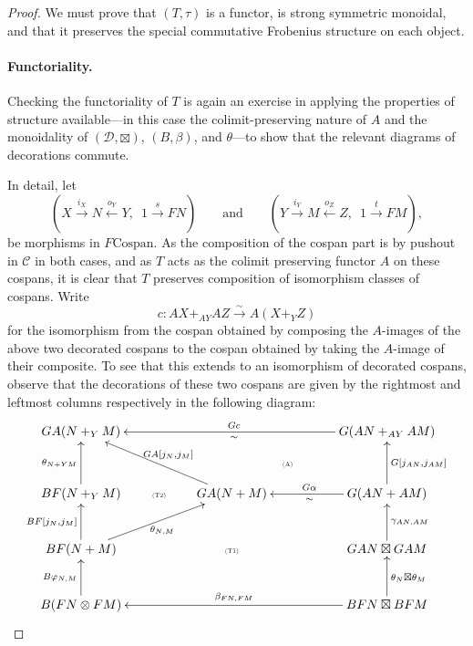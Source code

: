 \begin{proof}
  We must prove that $(T,\tau)$ is a functor, is strong symmetric monoidal, and
  that it preserves the special commutative Frobenius structure on each object.

  \paragraph{Functoriality.}
  Checking the functoriality of $T$ is again an exercise in applying the
  properties of structure available---in this case the colimit-preserving nature
  of $A$ and the monoidality of $(\mathcal D,\boxtimes)$, $(B,\beta)$, and
  $\theta$---to show that the relevant diagrams of decorations commute. 
  
  In detail, let 
\[
  (X \stackrel{i_X}\longrightarrow N \stackrel{o_Y}\longleftarrow Y, \enspace 1
  \stackrel{s}\longrightarrow FN)
  \qquad \mbox{and} \qquad
  (Y \stackrel{i_Y}\longrightarrow M \stackrel{o_Z}\longleftarrow Z, \enspace 1
  \stackrel{t}\longrightarrow FM), 
\]
be morphisms in $F\mathrm{Cospan}$. As the composition of the cospan part is by
pushout in $\mathcal C$ in both cases, and as $T$ acts as the colimit preserving
functor $A$ on these cospans, it is clear that $T$ preserves composition of
isomorphism classes of cospans. Write
\[
  c\colon  AX+_{AY}AZ \stackrel\sim\longrightarrow A(X+_YZ)
\]
for the isomorphism from the cospan obtained by composing the $A$-images of the
above two decorated cospans to the cospan obtained by taking the $A$-image of their
composite. To see that this extends to an isomorphism of decorated cospans,
observe that the decorations of these two cospans are given by the rightmost and
leftmost columns respectively in the following diagram:
\[
  \xymatrixcolsep{.5pc}
  \xymatrixrowsep{.9pc}
  \xymatrix{ 
    GA(N+_YM) &&&&&&&& \ar[llllllll]_{Gc}^{\sim} G(AN+_{AY}AM) \\
    &&&&& \textsc{\tiny(A)} \\
    BF(N+_YM) \ar[uu]^{\theta_{N+YM}} && \textsc{\tiny(T2)} && GA(N+M)
    \ar[uullll]_{GA[j_N,j_M]} &&&& G(AN+AM) \ar[uu]_{G[j_{AN},j_{AM}]}
    \ar[llll]^{\sim}_{G\alpha} \\
    \\
    BF(N+M) \ar[uu]^{BF[j_N,j_M]} \ar[uurrrr]_{\theta_{N,M}} &&&&
    \textsc{\tiny(T1)} &&&& GAN \boxtimes GAM \ar[uu]_{\gamma_{AN,AM}} \\
    \\
    B(FN \otimes FM) \ar[uu]^{B\varphi_{N,M}} &&&&&&&& BFN \boxtimes BFM
    \ar[uu]_{\theta_N \boxtimes \theta_M} \ar[llllllll]_{\beta_{FN,FM}} \\
}\]
\end{proof}
